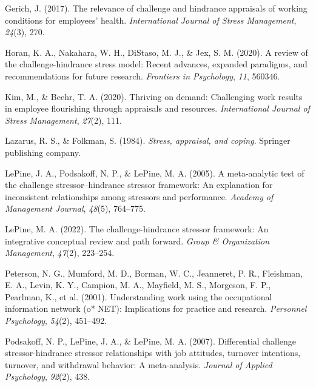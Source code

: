 \documentclass[
  man,mask]{apa6}
\newlength{\cslhangindent}
\newlength{\cslentryspacingunit} %
\newenvironment{CSLReferences}[2] %
 {%
  \setlength{\parindent}{0pt}
  \ifodd #1
  \let\oldpar\par
  \def\par{\hangindent=\cslhangindent\oldpar}
  \fi
  \setlength{\parskip}{#2\cslentryspacingunit}
 }%
 {}
\begin{document}
\begin{CSLReferences}{1}{0}
\leavevmode{}%
Gerich, J. (2017). The relevance of challenge and hindrance appraisals of working conditions for employees' health. \emph{International Journal of Stress Management}, \emph{24}(3), 270.

\leavevmode{}%
Horan, K. A., Nakahara, W. H., DiStaso, M. J., \& Jex, S. M. (2020). A review of the challenge-hindrance stress model: Recent advances, expanded paradigms, and recommendations for future research. \emph{Frontiers in Psychology}, \emph{11}, 560346.

\leavevmode{}%
Kim, M., \& Beehr, T. A. (2020). Thriving on demand: Challenging work results in employee flourishing through appraisals and resources. \emph{International Journal of Stress Management}, \emph{27}(2), 111.

\leavevmode{}%
Lazarus, R. S., \& Folkman, S. (1984). \emph{Stress, appraisal, and coping}. Springer publishing company.

\leavevmode{}%
LePine, J. A., Podsakoff, N. P., \& LePine, M. A. (2005). A meta-analytic test of the challenge stressor--hindrance stressor framework: An explanation for inconsistent relationships among stressors and performance. \emph{Academy of Management Journal}, \emph{48}(5), 764--775.

\leavevmode{}%
LePine, M. A. (2022). The challenge-hindrance stressor framework: An integrative conceptual review and path forward. \emph{Group \& Organization Management}, \emph{47}(2), 223--254.

\leavevmode{}%
Peterson, N. G., Mumford, M. D., Borman, W. C., Jeanneret, P. R., Fleishman, E. A., Levin, K. Y., Campion, M. A., Mayfield, M. S., Morgeson, F. P., Pearlman, K., et al. (2001). Understanding work using the occupational information network (o* NET): Implications for practice and research. \emph{Personnel Psychology}, \emph{54}(2), 451--492.

\leavevmode{}%
Podsakoff, N. P., LePine, J. A., \& LePine, M. A. (2007). Differential challenge stressor-hindrance stressor relationships with job attitudes, turnover intentions, turnover, and withdrawal behavior: A meta-analysis. \emph{Journal of Applied Psychology}, \emph{92}(2), 438.


\end{CSLReferences}
\end{document}
